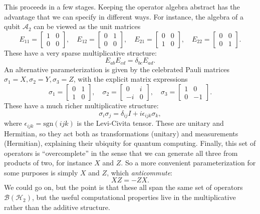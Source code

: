 This proceeds in a few stages. Keeping the operator algebra abstract
has the advantage that we can specify in different ways.
For instance, the algebra of a qubit $\mathcal{A}_2$ can be viewed as
the unit matrices
\[
  E_{11} =
  \begin{bmatrix}
    1 & 0 \\ 0 & 0
  \end{bmatrix}, \quad
  E_{12} =
  \begin{bmatrix}
    0 & 1 \\ 0 & 0
  \end{bmatrix}, \quad
  E_{21} =
  \begin{bmatrix}
    0 & 0 \\ 1 & 0
  \end{bmatrix}, \quad
  E_{22} =
  \begin{bmatrix}
    0 & 0 \\ 0 & 1
  \end{bmatrix}.
\]
These have a very sparse multiplicative structure:
  \begin{equation}
  E_{ab}E_{cd} = \delta_{bc}E_{ad}.\label{eq:pres-e}
\end{equation}
An alternative parameterization is given by the celebrated Pauli
matrices $\sigma_1 = X, \sigma_2 = Y, \sigma_3 = Z$, with the explicit
matrix expressions
  \begin{equation}
  \sigma_1 =
  \begin{bmatrix}
    0 & 1 \\ 1 & 0
  \end{bmatrix}, \quad
  \sigma_2 =
  \begin{bmatrix}
    0 & i \\ -i & 0
  \end{bmatrix}, \quad
    \sigma_3 =
  \begin{bmatrix}
    1 & 0 \\ 0 & -1
  \end{bmatrix}.\label{eq:pauli-mats}
\end{equation}
These have a much richer multiplicative structure:
\begin{equation}
  \sigma_i \sigma_j = \delta_{ij} I + i \epsilon_{ijk}
  \sigma_k,\label{eq:pauli-rel}
\end{equation}
where $\epsilon_{ijk} = \mbox{sgn}(ijk)$ is the Levi-Civita tensor.
These are unitary and Hermitian, so they act both as transformations
(unitary) and measurements (Hermitian), explaining their ubiquity for
quantum computing. Finally, this set of operators is ``overcomplete''
in the sense that we can generate all three from products of two, for
instance $X$ and $Z$. So a more convenient parameterization for some
purposes is simply $X$ and $Z$, which \emph{anticommute}:
\[
  XZ = -ZX.
\]
We could go on, but the point is that these all span the same set of
operators $\mathcal{B}(\mathcal{H}_2)$, but the useful computational
properties live in the multiplicative rather than the additive
structure.

